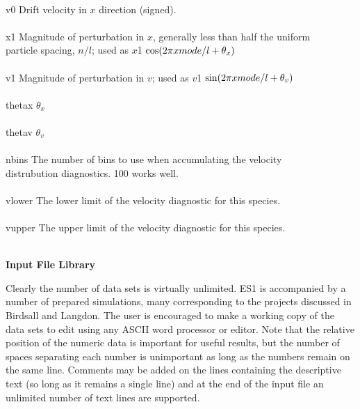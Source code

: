 \begin{section}
\begin{subsection}
\begin{subsubsection}
\begin{tabbing}
								\\
      v0        \>     Drift velocity in $x$ direction (signed). \> \\
								\\
      x1        \>     Magnitude of perturbation in $x$, generally less than half
                    the uniform \> \\
		\> particle spacing, $n/l$; used as
                    $x$1 $\cos ({\rm 2 \pi} x mode / l + \theta_{x})$ \> \\
								\\
      v1        \>     Magnitude of perturbation in $v$; used as
		    $v$1 $\sin ({\rm 2 \pi} x mode / l + \theta_{v})$ \> \\
								\\
      thetax    \>    $\theta_{x}$ \> \\
								\\
      thetav    \>     $\theta_{v}$ \> \\
		\\
      nbins     \>    The number of bins to use when accumulating the velocity \> \\
		\>    distrubution diagnostics.  100 works well.  \\
								\\
      vlower    \>    The lower limit of the velocity diagnostic for this species. \> \\
								\\
      vupper    \>    The upper limit of the velocity diagnostic for this species. \> \\
								\\
\end{tabbing}

\end{subsubsection}
\end{subsection}

\begin{subsection}
{\bf Input File Library}

   Clearly the number of data sets is virtually unlimited.  ES1 is accompanied
   by a number of prepared simulations, many corresponding to the projects
   discussed in Birdsall and Langdon.  The user is encouraged to make a working
   copy of the data sets to edit using any ASCII word processor or editor.
   Note that the relative position of the numeric data is important for useful
   results, but the number of spaces separating each number is unimportant as
   long as the numbers remain on the same line.  Comments may be added on the
   lines containing the descriptive text (so long as it remains a single line)
   and at the end of the input file an unlimited number of text lines are
   supported.


\end{subsection}
\end{section}
